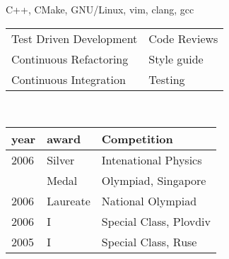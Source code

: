 C++, CMake, GNU/Linux, vim, clang, gcc
\begin{tabular}{ l l}
 Test Driven Development & Code Reviews \\
 Continuous Refactoring & Style guide \\
 Continuous Integration & Testing \\
\end{tabular}\\
\vspace{-0.4cm}
\begin{tabular}{ p{} p{} p{} }
year & award & Competition \\
\hline
2006 & Silver  & Intenational Physics \\
     & Medal   & Olympiad, Singapore  \\
2006 & Laureate& National Olympiad\\
2006 & I   & Special Class, Plovdiv  \\
2005 & I   & Special Class, Ruse     \\
\end{tabular}\\
